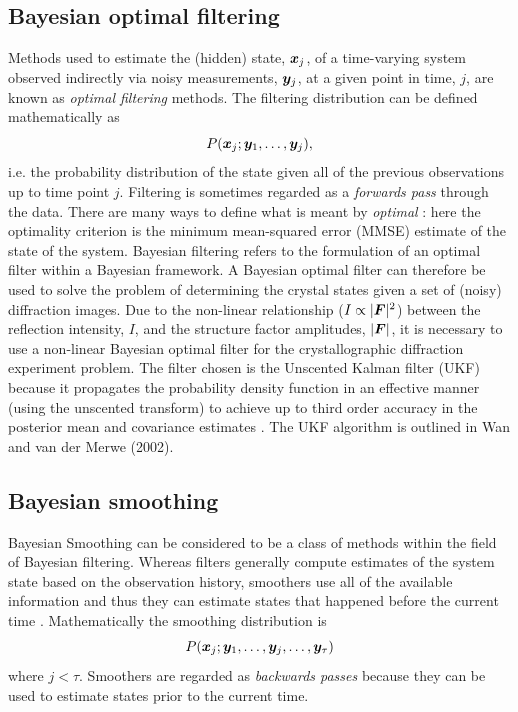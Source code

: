 \subsection{Bayesian optimal filtering}
\label{sub:Bayesian optimal filtering}
Methods used to estimate the (hidden) state, $\boldsymbol{x}_j$, of a time-varying system observed indirectly via noisy measurements, $\boldsymbol{y}_j$, at a given point in time, $j$,  are known as \textit{optimal filtering} methods.
The filtering distribution can be defined mathematically as
\begin{equation}
    P(\boldsymbol{x}_j ; \boldsymbol{y}_1, \ldots, \boldsymbol{y}_j),
    \label{eq:Filtering Distribution}
\end{equation}
i.e. the probability distribution of the state given all of the previous observations up to time point $j$.
Filtering is sometimes regarded as a \textit{forwards pass} through the data.
There are many ways to define what is meant by \textit{optimal} \cite{chen2003bayesian}: here the optimality criterion is the minimum mean-squared error (MMSE) estimate of the state of the system.
Bayesian filtering refers to the formulation of an optimal filter within a Bayesian framework.
A Bayesian optimal filter can therefore be used to solve the problem of determining the crystal states given a set of (noisy) diffraction images.
Due to the non-linear relationship ($I \propto |\boldsymbol{F}|^2$) between the reflection intensity, $I$, and the structure factor amplitudes, $|\boldsymbol{F}|$, it is necessary to use a non-linear Bayesian optimal filter for the crystallographic diffraction experiment problem.
The filter chosen is the Unscented Kalman filter (UKF) because it propagates the probability density function in an effective manner (using the unscented transform) to achieve up to third order accuracy in the posterior mean and covariance estimates \cite{wan2000unscented}.
The UKF algorithm is outlined in Wan and van der Merwe (2002). \nocite{wan2002Unscented}

\subsection{Bayesian smoothing}
\label{sub:Bayesian Smoothing}
Bayesian Smoothing can be considered to be a class of methods within the field of Bayesian filtering.
Whereas filters generally compute estimates of the system state based on the observation history, smoothers use all of the available information and thus they can estimate states that happened before the current time \cite{sarkka2013}.
Mathematically the smoothing distribution is
\begin{equation}
    P(\boldsymbol{x}_j ; \boldsymbol{y}_1, \ldots, \boldsymbol{y}_j, \ldots, \boldsymbol{y}_{\tau})
    \label{eq:Smoothing Distribution}
\end{equation}
where $j < \tau$.
Smoothers are regarded as \textit{backwards passes} because they can be used to estimate states prior to the current time.

